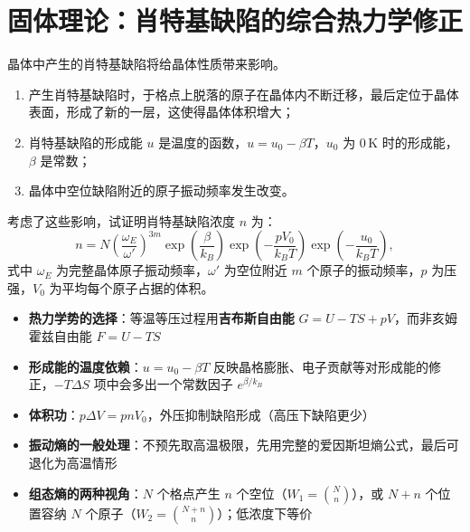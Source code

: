 \section{固体理论：肖特基缺陷的综合热力学修正}
\label{sec:schottky-full-thermo}

\begin{modelbox}
晶体中产生的肖特基缺陷将给晶体性质带来影响。
\begin{enumerate}
    \item 产生肖特基缺陷时，于格点上脱落的原子在晶体内不断迁移，最后定位于晶体表面，形成了新的一层，这使得晶体体积增大；
    \item 肖特基缺陷的形成能 $u$ 是温度的函数，$u = u_0 - \beta T$，$u_0$ 为 $0\,\mathrm{K}$ 时的形成能，$\beta$ 是常数；
    \item 晶体中空位缺陷附近的原子振动频率发生改变。
\end{enumerate}

考虑了这些影响，试证明肖特基缺陷浓度 $n$ 为：
\begin{equation}
n = N\left(\frac{\omega_E}{\omega'}\right)^{\!3m}
\exp\!\left(\frac{\beta}{k_{\!B}}\right)
\exp\!\left(-\frac{pV_0}{k_{\!B}T}\right)
\exp\!\left(-\frac{u_0}{k_{\!B}T}\right),
\end{equation}
式中 $\omega_E$ 为完整晶体原子振动频率，$\omega'$ 为空位附近 $m$ 个原子的振动频率，$p$ 为压强，$V_0$ 为平均每个原子占据的体积。
\end{modelbox}

\begin{tipbox}[考点快速分析]
\begin{itemize}
    \item \textbf{热力学势的选择}：等温等压过程用\textbf{吉布斯自由能} $G=U-TS+pV$，而非亥姆霍兹自由能 $F=U-TS$
    \item \textbf{形成能的温度依赖}：$u=u_0-\beta T$ 反映晶格膨胀、电子贡献等对形成能的修正，$-T\Delta S$ 项中会多出一个常数因子 $e^{\beta/k_{\!B}}$
    \item \textbf{体积功}：$p\Delta V=pnV_0$，外压抑制缺陷形成（高压下缺陷更少）
    \item \textbf{振动熵的一般处理}：不预先取高温极限，先用完整的爱因斯坦熵公式，最后可退化为高温情形
    \item \textbf{组态熵的两种视角}：$N$ 个格点产生 $n$ 个空位（$W_1=\binom{N}{n}$），或 $N+n$ 个位置容纳 $N$ 个原子（$W_2=\binom{N+n}{n}$）；低浓度下等价
\end{itemize}
\end{tipbox}


